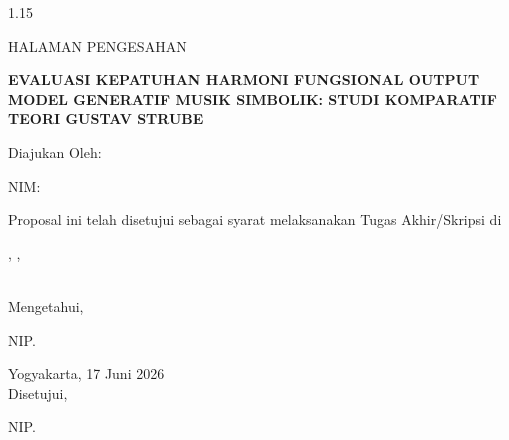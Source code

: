\setcounter{page}{2}

\newpage
\begin{spacing}{1.15}
\begin{center}
    HALAMAN PENGESAHAN\par
    \vspace{1cm}
    \textbf{EVALUASI KEPATUHAN HARMONI FUNGSIONAL OUTPUT MODEL GENERATIF MUSIK SIMBOLIK: STUDI KOMPARATIF TEORI GUSTAV STRUBE}\par
    \vspace{0.5cm}
    Diajukan Oleh:\par
    \researchername\par
    NIM: \researchernim\par
    \vspace{1.5cm}
    Proposal ini telah disetujui sebagai syarat melaksanakan Tugas Akhir/Skripsi di\par
    \programstudy, \facultyname,\par
    \institutionname\par
    \vspace{2cm}
    
    \begin{minipage}[t]{0.45\textwidth}
        \centering
        ~\\
        Mengetahui,\par
        \vspace{3cm}
        \textbf{\advisoracademic}\par
        NIP. \advisoracademicnip
    \end{minipage}
    \hfill
    \begin{minipage}[t]{0.45\textwidth}
        \centering
        Yogyakarta, 17 Juni 2026\\
        Disetujui,\par
        \vspace{3cm}
        \textbf{\advisorthesis}\par
        NIP. \advisorthesisnip
    \end{minipage}
\end{center}
\end{spacing}

